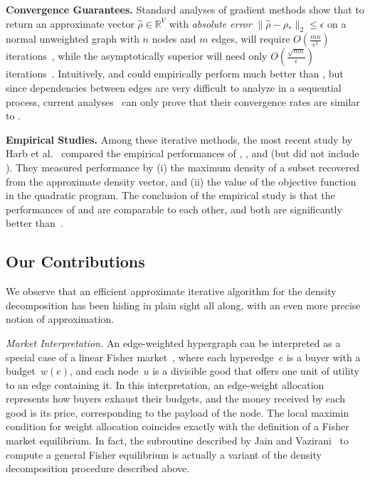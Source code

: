 \noindent \textbf{Convergence Guarantees.} Standard analyses of gradient methods show that to return an approximate vector $\widehat{\rho} \in \mathbb{R}^V$ with \emph{absolute error} $\| \widehat{\rho} - \rho_*\|_2 \leq \epsilon$ on a normal
unweighted graph with $n$ nodes and $m$ edges, \fw will require $O\left(\frac{mn}{\epsilon^2}\right)$ iterations~\cite{DBLP:conf/www/DanischCS17}, while the asymptotically superior \fista will need only $O\left(\frac{\sqrt{mn}}{\epsilon}\right)$ iterations~\cite{DBLP:conf/nips/HarbQC22}. Intuitively, \elist and \greedypp could empirically perform much better than \fw, but since dependencies between edges are very difficult to analyze in a sequential process, 
current analyses~\cite{DBLP:conf/www/BoobGPSTWW20,DBLP:conf/esa/HarbQC23}
can only prove that their convergence rates are similar to \fw.


\noindent \textbf{Empirical Studies.} 
Among these iterative methods, the most recent study by Harb et al.~\cite{DBLP:conf/nips/HarbQC22} compared the empirical performances of \fw, \greedypp, and \fista (but did not include \elist). They measured performance by (i) the maximum density of a subset recovered from the approximate density vector, and (ii) the value of the objective function in the quadratic program. The conclusion of the empirical study is that the performances of \fista and \greedypp are comparable to each other, and both are significantly better than~\fw.




\subsection{Our Contributions}

We observe that an efficient approximate iterative
algorithm for the density decomposition has been hiding in plain sight all along,
with an even more precise notion of approximation.


\noindent \emph{Market Interpretation.} An edge-weighted hypergraph can be interpreted as a special case of a linear Fisher market~\cite{fisher1892}, where each hyperedge~$e$ is a buyer with a budget~$w(e)$, and each node~$u$ is a divisible good that offers one unit of utility to an edge containing it. In this interpretation, an edge-weight allocation represents how buyers exhaust their budgets, and the money received by each good is its price, corresponding to the payload of the node. The local maximin condition for weight allocation coincides exactly with the definition of a Fisher market equilibrium. In fact, the subroutine described by Jain and Vazirani~\cite{DBLP:journals/geb/JainV10}
 to compute a general Fisher equilibrium is actually a variant of the density decomposition procedure described above.



